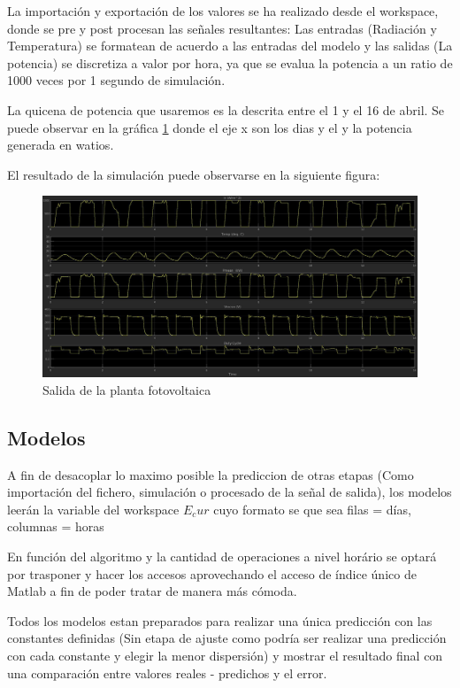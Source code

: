 La importación y exportación de los valores se ha realizado desde el workspace, donde se pre y post procesan las señales resultantes: Las entradas (Radiación y Temperatura) se formatean de acuerdo a las entradas del modelo y las salidas (La potencia) se discretiza a valor por hora, ya que se evalua la potencia a un ratio de 1000 veces por 1 segundo de simulación.

La quicena de potencia que usaremos es la descrita entre el 1 y el 16 de abril. Se puede observar en la gráfica \ref{fig:Ppv_output} donde el eje x son los dias y el y la potencia generada en watios.

El resultado de la simulación puede observarse en la siguiente figura:

\begin{figure}[h]
    \includegraphics[width=\textwidth]{Model_cur_outputs_010417.jpg}
    \caption{Salida de la planta fotovoltaica}
    \label{fig:Ppv_output}
\end{figure}


\subsection{Modelos}

A fin de desacoplar lo maximo posible la prediccion de otras etapas (Como importación del fichero, simulación o procesado de la señal de salida), los modelos leerán la variable del workspace $E_cur$ cuyo formato se que sea filas = días, columnas = horas

En función del algoritmo y la cantidad de operaciones a nivel horário se optará por trasponer y hacer los accesos aprovechando el acceso de índice único de Matlab a fin de poder tratar de manera más cómoda.

Todos los modelos estan preparados para realizar una única predicción con las constantes definidas (Sin etapa de ajuste como podría ser realizar una predicción con cada constante y elegir la menor dispersión) y mostrar el resultado final con una comparación entre valores reales - predichos y el error.